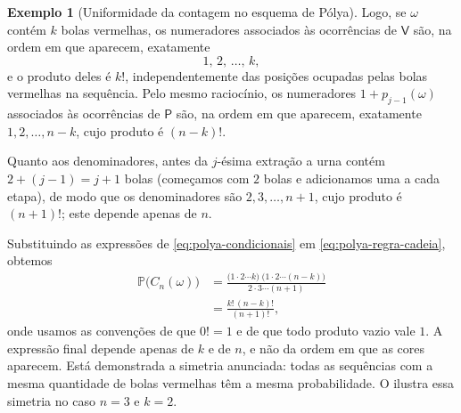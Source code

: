 \documentclass[12pt,portuguese]{article}
\theoremstyle{definition}
\newtheorem{example}[example]{Exemplo}
\begin{document}
\begin{example}[Uniformidade da contagem no esquema de Pólya]
Logo, se $\omega$ contém $k$ bolas vermelhas, os numeradores associados às
ocorrências de $\mathsf{V}$ são, na ordem em que aparecem, exatamente
\[
  1,\,2,\,\ldots,\,k,
\]
e o produto deles é $k!$, independentemente das posições ocupadas pelas
bolas vermelhas na sequência. Pelo mesmo raciocínio, os numeradores
$1+p_{j-1}(\omega)$ associados às ocorrências de $\mathsf{P}$ são, na ordem
em que aparecem, exatamente $1,2,\ldots,n-k$, cujo produto é $(n-k)!$.

Quanto aos denominadores, antes da $j$-ésima extração a urna contém
$2+(j-1)=j+1$ bolas (começamos com $2$ bolas e adicionamos uma a cada etapa),
de modo que os denominadores são $2,3,\ldots,n+1$, cujo produto é $(n+1)!$;
este depende apenas de $n$.

Substituindo as expressões de \eqref{eq:polya-condicionais} em
\eqref{eq:polya-regra-cadeia}, obtemos
\[
  \begin{aligned}
    \mathbb{P}\big(C_n(\omega)\big)
    &= \frac{\big(1\cdot 2\cdots k\big)\;\big(1\cdot 2\cdots (n-k)\big)}{2\cdot 3\cdots(n+1)} \\
    &= \frac{k!\,(n-k)!}{(n+1)!},
  \end{aligned}
\]
onde usamos as convenções de que $0!=1$ e de que todo produto vazio vale $1$.
A expressão final depende apenas de $k$ e de $n$, e não da ordem em que as
cores aparecem. Está demonstrada a simetria anunciada: todas as sequências com
a mesma quantidade de bolas vermelhas têm a mesma probabilidade. O
 ilustra essa simetria no caso $n=3$ e $k=2$.

\begin{figure}[H]
\centering
{}
\end{figure}
\end{example}
\end{document}
